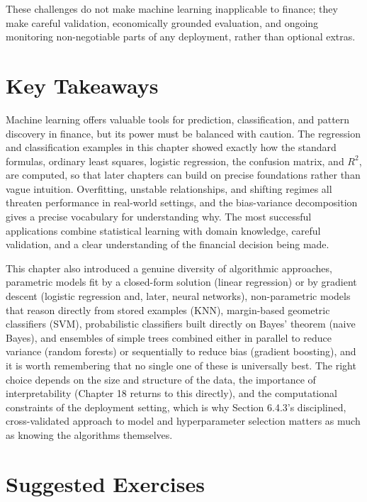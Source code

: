\documentclass[../ai_in_finance]{subfiles}
\begin{document}
These challenges do not make machine learning inapplicable to finance; they make careful validation, economically grounded evaluation, and ongoing monitoring non-negotiable parts of any deployment, rather than optional extras.

\section{Key Takeaways}

Machine learning offers valuable tools for prediction, classification, and pattern discovery in finance, but its power must be balanced with caution. The regression and classification examples in this chapter showed exactly how the standard formulas, ordinary least squares, logistic regression, the confusion matrix, and $R^2$, are computed, so that later chapters can build on precise foundations rather than vague intuition. Overfitting, unstable relationships, and shifting regimes all threaten performance in real-world settings, and the bias-variance decomposition gives a precise vocabulary for understanding why. The most successful applications combine statistical learning with domain knowledge, careful validation, and a clear understanding of the financial decision being made.

This chapter also introduced a genuine diversity of algorithmic approaches, parametric models fit by a closed-form solution (linear regression) or by gradient descent (logistic regression and, later, neural networks), non-parametric models that reason directly from stored examples (KNN), margin-based geometric classifiers (SVM), probabilistic classifiers built directly on Bayes' theorem (naive Bayes), and ensembles of simple trees combined either in parallel to reduce variance (random forests) or sequentially to reduce bias (gradient boosting), and it is worth remembering that no single one of these is universally best. The right choice depends on the size and structure of the data, the importance of interpretability (Chapter 18 returns to this directly), and the computational constraints of the deployment setting, which is why Section 6.4.3's disciplined, cross-validated approach to model and hyperparameter selection matters as much as knowing the algorithms themselves.

\section{Suggested Exercises}
\end{document}
